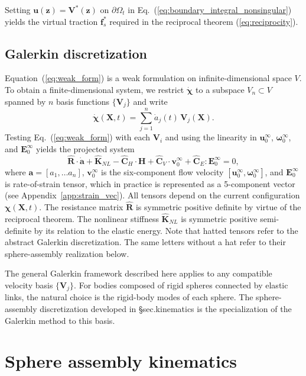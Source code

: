\documentclass[aps,prfluids,groupedaddress]{revtex4-2}
\newcommand{\bff}{\bm{f}}
\newcommand{\bu}{\bm{u}}
\newcommand{\bv}{\bm{v}}
\newcommand{\bz}{\bm{z}}
\newcommand{\bchi}{\bm{\chi}}
\newcommand{\bomega}{\bm{\omega}}
\newcommand{\ba}{\bm{a}}
\newcommand{\bH}{\bm{H}}
\newcommand{\bV}{\bm{V}}
\newcommand{\bX}{\bm{X}}
\newcommand{\tC}{\bm{{C}}}
\newcommand{\tE}{\bm{{E}}}
\newcommand{\tK}{\bm{{K}}}
\newcommand{\tR}{\bm{{R}}}
\newcommand{\bxd}{\bm{\dot \chi}}
\begin{document}
Setting $\bu(\bz) = \bV^*(\bz)$ on $\partial\Omega_t$ in Eq.~(\ref{eq:boundary_integral_nonsingular}) yields the virtual traction $\bff_s^*$ required in the reciprocal theorem (\ref{eq:reciprocity}).


\subsection{Galerkin discretization\label{sec:Galerkin}}
Equation~(\ref{eq:weak_form}) is a weak formulation on infinite-dimensional space $V$. 
To obtain a finite-dimensional system, we restrict $\bxd$ to a subspace $V_n\subset V$ spanned by $n$ basis functions $\{\bV_j\}$ and write
\begin{equation}
\bxd (\bX,t) =  \sum_{j=1}^n \dot{a}_j(t)\, \bV_j(\bX).
\end{equation}
Testing Eq.~(\ref{eq:weak_form}) with each $\bV_i$ and using the linearity in $\bu_0^\infty$, $\bomega_0^\infty$, and $\tE_0^\infty$ yields the projected system
\begin{equation}\label{eq:galerkin_system}
\hat{\tR} \cdot \dot{\ba} + \hat{\tK}_{NL} - \hat{\tC}_H\cdot\bH + \hat{\tC}_V \cdot \bv_0^\infty + \hat{\tC}_E : \tE_0^\infty = 0,
\end{equation}
where $\ba = [a_1,\dots a_n]$, $\bv_0^\infty$ is the six-component flow velocity $[\bu_0^\infty,\bomega_0^\infty]$, and $\tE_0^\infty$ is rate-of-strain tensor, which in practice is represented as a 5-component vector (see Appendix~\ref{app:strain_vec}). All tensors depend on the current configuration $\bchi(\bX,t)$. The resistance matrix $\hat{\tR}$ is symmetric positive definite by virtue of the reciprocal theorem. The nonlinear stiffness $\hat{\tK}_{NL}$ is symmetric positive semi-definite by its relation to the elastic energy. Note that hatted tensors refer to the abstract Galerkin discretization. The same letters without a hat refer to their sphere-assembly realization below.

The general Galerkin framework described here applies to any compatible velocity basis $\{\bV_j\}$. For bodies composed of rigid spheres connected by elastic links, the natural choice is the rigid-body modes of each sphere. The sphere-assembly discretization developed in \S{sec.kinematics} is the specialization of the Galerkin method to this basis.


\section{Sphere assembly kinematics}
\end{document}
